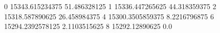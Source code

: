 0 15343.615234375 51.486328125
1 15336.447265625 44.318359375
2 15318.587890625 26.458984375
4 15300.3505859375 8.2216796875
6 15294.2392578125 2.1103515625
8 15292.12890625 0.0
